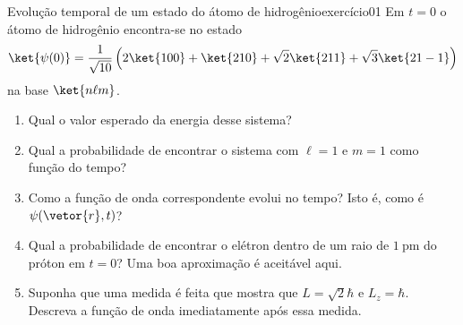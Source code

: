 \begin{exercício}{Evolução temporal de um estado do átomo de hidrogênio}{exercício01}
    Em \(t = 0\) o átomo de hidrogênio encontra-se no estado
    \begin{equation*}
        \ket{\psi(0)} = \frac1{\sqrt{10}} \left(2 \ket{100} + \ket{210} + \sqrt{2} \ket{211} + \sqrt{3}\ket{21 -1}\right)
    \end{equation*}
    na base \(\ket{n\ell m}\).
    \begin{enumerate}[label=(\alph*)]
        \item Qual o valor esperado da energia desse sistema?
        \item Qual a probabilidade de encontrar o sistema com \(\ell = 1\) e \(m = 1\) como função do tempo?
        \item Como a função de onda correspondente evolui no tempo? Isto é, como é \(\psi(\vetor{r}, t)\)?
        \item Qual a probabilidade de encontrar o elétron dentro de um raio de \(\SI{1}{\pico\meter}\) do próton em \(t = 0\)? Uma boa aproximação é aceitável aqui.
        \item Suponha que uma medida é feita que mostra que \(L = \sqrt{2}\hbar\) e \(L_z = \hbar\). Descreva a função de onda imediatamente após essa medida.
    \end{enumerate}
\end{exercício}
